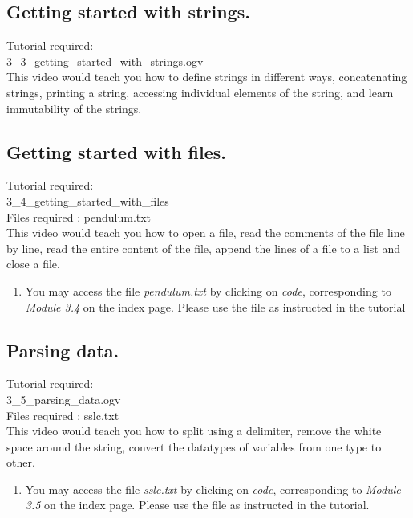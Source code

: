 \documentclass[11pt,twocolumn]{article}
\newenvironment{enumcpt}{\begin{enumerate} \topsep 0pt \partopsep 0pt 
                        \parsep 0pt
                        \itemsep 0pt \leftmargin -1in \rightmargin 0pt
                        }{\end{enumerate}}
\begin{document}
\subsection{Getting started with strings.}
Tutorial required: \\ 3\_3\_getting\_started\_with\_strings.ogv \\
This video would teach you how to define strings in different ways, concatenating strings, printing a string, accessing individual elements of the string, and learn immutability of the strings. 
\subsection{Getting started with files.}
Tutorial required: \\ 3\_4\_getting\_started\_with\_files \\
Files required : pendulum.txt \\
This video would teach you how to open a file, read the comments of the file line by line, read the entire content of the file, append the lines of a file to a list and close a file.
\begin{enumcpt}
\item You may access the file  \emph{pendulum.txt}  by clicking on \emph{code}, corresponding to \emph{Module 3.4} on the index page. Please use the file as instructed in the tutorial
\end{enumcpt}

\subsection{Parsing data.}
Tutorial required: \\ 3\_5\_parsing\_data.ogv \\
Files required : sslc.txt \\
This video would teach you how to split using a delimiter, remove the white space around the string, convert the datatypes  of variables from one type to other. 
\begin{enumcpt}
\item You may access the file  \emph{sslc.txt} by clicking on \emph{code}, corresponding to \emph{Module 3.5} on the index page. Please use the file as instructed in the tutorial. 
\end{enumcpt}
\end{document}
